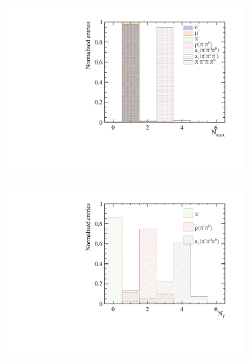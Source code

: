 \begin{figure}[htbp]
\centering
\begin{subfigure}[b]{0.45\textwidth}
 \includegraphics[width=\textwidth]{tau/var2/nCharge_100GeV_improved.pdf}
  \caption{}
  \label{fig:tauVarNCharge}
\end{subfigure}
\begin{subfigure}[b]{0.45\textwidth}
 \includegraphics[width=\textwidth]{tau/var2/nPhoton_100GeV_improved.pdf}
  \caption{}
  \label{fig:tauVarNPhoton}
\end{subfigure}
\begin{subfigure}[b]{0.45\textwidth}

\end{subfigure}
\end{figure}
